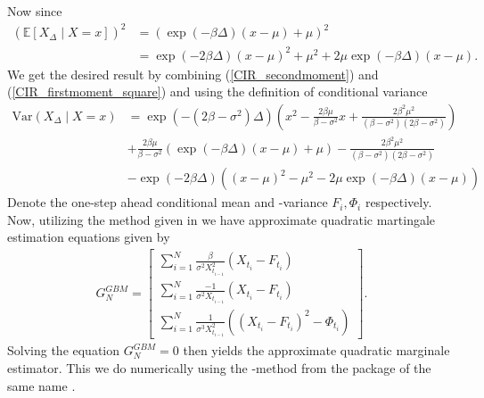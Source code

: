 Now since 
\begin{align}
    \left(\mathbb{E}\left[X_\Delta\middle|X=x\right]\right)^2 &= \left(\exp\left(-\beta\Delta\right)\left(x-\mu\right) + \mu\right)^2 \nonumber\\
    &= \exp\left(-2\beta\Delta\right)\left(x-\mu\right)^2 + \mu^2 + 2\mu\exp\left(-\beta\Delta\right)\left(x-\mu\right). \label{CIR_firstmoment_square}
\end{align}
We get the desired result by combining (\ref{CIR_secondmoment}) and (\ref{CIR_firstmoment_square}) and using the definition of conditional variance
\begin{align}
    \mathrm{Var}\left(X_\Delta \middle| X = x\right) &= \exp\left(-\left(2\beta - \sigma^2\right)\Delta\right)\left(x^2 - \frac{2\beta\mu}{\beta-\sigma^2}x + \frac{2\beta^2 \mu^2}{\left(\beta-\sigma^2\right)\left(2\beta - \sigma^2\right)}\right) \nonumber \\
    &+ \frac{2\beta\mu}{\beta-\sigma^2}\left(\exp\left(-\beta\Delta\right)\left(x-\mu\right) + \mu\right) - \frac{2\beta^2\mu^2}{\left(\beta-\sigma^2\right)\left(2\beta - \sigma^2\right)} \nonumber\\
    &- \exp\left(-2\beta\Delta\right)\left(\left(x-\mu\right)^2 - \mu^2 - 2\mu\exp\left(-\beta\Delta\right)\left(x-\mu\right)\right)
\end{align} 
Denote the one-step ahead conditional mean and -variance $F_i, \Phi_i$ respectively. Now, utilizing the method given in \cite[example 1.11]{StatisticalMethodsForSDE} we have approximate quadratic martingale estimation equations given by
\begin{align}
    G_N^{GBM} = \begin{bmatrix}
        \sum_{i = 1}^N \frac{\beta}{\sigma^2 X_{t_{i-1}}^2}\left(X_{t_i} - F_{t_i}\right)\\
        \sum_{i = 1}^N \frac{-1}{\sigma^2 X_{t_{i-1}}}\left(X_{t_i} - F_{t_i}\right)\\
        \sum_{i = 1}^N \frac{1}{\sigma^3 X_{t_{i-1}}^2}\left(\left(X_{t_i} - F_{t_i}\right)^2 - \Phi_{t_i}\right)
    \end{bmatrix}.
\end{align}
Solving the equation $G_N^{GBM} = 0$ then yields the approximate quadratic marginale estimator. This we do numerically using the -method from the package of the same name \cite{nleqslv}.
